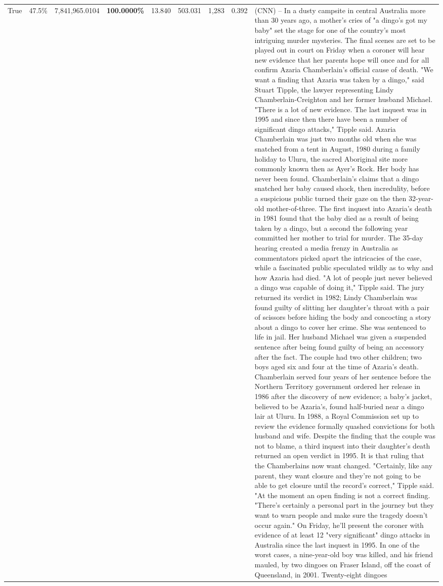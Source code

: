 \begin{table}[H]
\begin{tabular}{lllrlllll}
True & 47.5\% & 7,841,965.0104 & \bfseries \color{red} 100.0000\% & 13.840 & 503.031 & 1,283 & 0.392 & (CNN) -- In a dusty campsite in central Australia more than 30 years ago, a mother's cries of "a dingo's got my baby" set the stage for one of the country's most intriguing murder mysteries. The final scenes are set to be played out in court on Friday when a coroner will hear new evidence that her parents hope will once and for all confirm Azaria Chamberlain's official cause of death. "We want a finding that Azaria was taken by a dingo," said Stuart Tipple, the lawyer representing Lindy Chamberlain-Creighton and her former husband Michael. "There is a lot of new evidence. The last inquest was in 1995 and since then there have been a number of significant dingo attacks," Tipple said. Azaria Chamberlain was just two months old when she was snatched from a tent in August, 1980 during a family holiday to Uluru, the sacred Aboriginal site more commonly known then as Ayer's Rock. Her body has never been found. Chamberlain's claims that a dingo snatched her baby caused shock, then incredulity, before a suspicious public turned their gaze on the then 32-year-old mother-of-three. The first inquest into Azaria's death in 1981 found that the baby died as a result of being taken by a dingo, but a second the following year committed her mother to trial for murder. The 35-day hearing created a media frenzy in Australia as commentators picked apart the intricacies of the case, while a fascinated public speculated wildly as to why and how Azaria had died. "A lot of people just never believed a dingo was capable of doing it," Tipple said. The jury returned its verdict in 1982; Lindy Chamberlain was found guilty of slitting her daughter's throat with a pair of scissors before hiding the body and concocting a story about a dingo to cover her crime. She was sentenced to life in jail. Her husband Michael was given a suspended sentence after being found guilty of being an accessory after the fact. The couple had two other children; two boys aged six and four at the time of Azaria's death. Chamberlain served four years of her sentence before the Northern Territory government ordered her release in 1986 after the discovery of new evidence; a baby's jacket, believed to be Azaria's, found half-buried near a dingo lair at Uluru. In 1988, a Royal Commission set up to review the evidence formally quashed convictions for both husband and wife. Despite the finding that the couple was not to blame, a third inquest into their daughter's death returned an open verdict in 1995. It is that ruling that the Chamberlains now want changed. "Certainly, like any parent, they want closure and they're not going to be able to get closure until the record's correct," Tipple said. "At the moment an open finding is not a correct finding. "There's certainly a personal part in the journey but they want to warn people and make sure the tragedy doesn't occur again." On Friday, he'll present the coroner with evidence of at least 12 "very significant" dingo attacks in Australia since the last inquest in 1995. In one of the worst cases, a nine-year-old boy was killed, and his friend mauled, by two dingoes on Fraser Island, off the coast of Queensland, in 2001. Twenty-eight dingoes 
\end{tabular}
\end{table}
